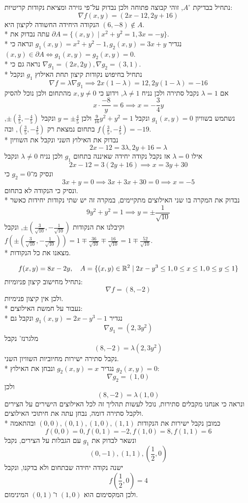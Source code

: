 נתחיל בבדיקת $A^\circ$, זוהי קבוצה פתוחה ולכן נבדוק על־פי גזירה ומציאת נקודות קריטיות:
\[
	\nabla f(x, y) = (2x - 12, 2y + 16)
\]
הנקודה היחידה החשודה לקיצון היא $(6, -8) \notin A$. \\*
עתה נבדוק את $\partial A = \{(x, y) \mid x^2 + y^2 = 1, 3x = -y \}$. \\*
נגדיר $g_1(x, y) = x^2 + y^2 - 1, g_2(x, y) = 3x + y$ ונראה כי $(x, y) \in \partial A \iff g_1(x, y) = g_2(x, y) = 0$. \\*
נראה גם כי $\nabla g_1 = (2x, 2y), \nabla g_2 = (3, 1)$. \\*
נתחיל בחיפוש נקודות קיצון תחת האילוץ $g_1$ ונקבל
\[
	\nabla f = \lambda \nabla g_1
	\implies
	2x (1 - \lambda) = 12, 2y (1 - \lambda) = -16
\]
אם $\lambda = 1$ נקבל סתירה ולכן נניח $\lambda \ne 1$, וידוע כי $x, y \ne 0$ מהתחום ולכן נוכל להסיק
\[
	x \cdot \frac{-8}{y} = 6 \implies x = -\frac{3}{4} y
\]
נשתמש בשוויון $g_1(x, y) = 0$ ונקבל $\frac{9}{16}y^2 + y^2 = 1$ ולכן $y = \pm \frac{4}{5}$ ונקבל $\pm(\frac{3}{5}, -\frac{4}{5})$, בתחום נמצאת רק $(\frac{3}{5}, -\frac{4}{5})$, ובה $f(\frac{3}{5}, -\frac{4}{5}) = -19$. \\*
נבדוק את האילוץ השני ונקבל את השוויון
\[
	2x - 12 = 3 \lambda, 2y + 16 = \lambda
\]
אילו $\lambda = 0$ אז נקבל נקודה יחידה שאיננה בתחום $g_1$ ולכן נניח $\lambda \ne 0$ ונקבל
\[
	2x - 12 = 3(2y + 16) \implies x = 3y + 30
\]
ונסיק מ־$g_2 = 0$ כי
\[
	3x + y = 0
	\implies 3x + 3x + 30 = 0
	\implies x = -5
\]
ונסיק כי הנקודה לא בתחום. \\*
נבדוק את המקרה בו שני האילוצים מתקיימים, במקרה זה יש שתי נקודות יחידות כאשר
\[
	9y^2 + y^2 = 1 \implies y = \pm \frac{1}{\sqrt{10}}
\]
וקיבלנו את הנקודות $\pm(\frac{3}{\sqrt{10}}, -\frac{1}{\sqrt{10}})$,
ונקבל $f(\pm(\frac{3}{\sqrt{10}}, -\frac{1}{\sqrt{10}})) = 1 \mp \frac{36}{\sqrt{10}} \mp \frac{16}{\sqrt{10}} = 1 \mp \frac{52}{\sqrt{10}}$. \\*
מצאנו את כל הנקודות.

\Subquestion{}
\[
	f(x, y) = 8x - 2y,
	\quad
	A = \{ (x, y) \in \mathbb{R}^2 \mid 2x - y^3 \le 1, 0 \le x \le 1, 0 \le y \le 1 \}
\]
נתחיל מחישוב קיצון פניומיות:
\[
	\nabla f = (8, -2)
\]
ולכן אין קיצון פנימיות. \\*
נעבור על חמשת האילוצים: \\*
נגדיר $g_1(x, y) = 2x - y^3 - 1$ ונקבל גם
\[
	\nabla g_1 = (2, 3y^2)
\]
מלגרנז' נקבל
\[
	(8, -2) = \lambda(2, 3y^2)
\]
נקבל סתירה ישירות מחיוביות השוויון השני. \\*
נגדיר $g_2(x, y) = x$ ונבחן את האילוץ $g_2(x, y) = 0$:
\[
	\nabla g_2 = (1, 0)
\]
ולכן
\[
	(8, -2) = \lambda(1, 0)
\]
ונראה כי אנחנו מקבלים סתירות, נוכל לעשות תהליך זה לכל האילוצים הישירים על הצירים ולקבל סתירה דומה, נבחן עתה את חיתוכי האילוצים. \\*
כמובן נקבל ישירות את הנקודות $(0, 0), (0, 1), (1, 0), (1, 1)$ ובהתאמה
\[
	f(0, 0) = 0,
	f(0, 1) = -2,
	f(1, 0) = 8,
	f(1, 1) = 6
\]
ונשאר לבדוק את $g_1$ עם הגבלות על הצירים, נקבל
\[
	(0, -1), (1, 1), (\frac{1}{2}, 0)
\]
ישנה נקודה יחידה שבתחום ולא בדקנו, ונקבל
\[
	f(\frac{1}{2}, 0) = 4
\]
ולכן המקסימום הוא $(1, 0)$ ו־$(0, 1)$ המינימום.

